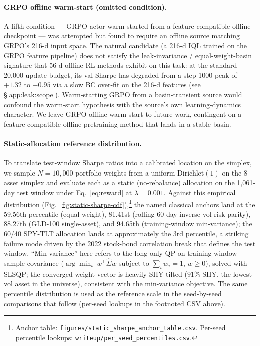 \paragraph{GRPO offline warm-start (omitted condition).}
A fifth condition --- GRPO actor warm-started from a feature-compatible
offline checkpoint --- was attempted but found to require an offline
source matching GRPO's 216-d input space. The natural candidate (a
216-d IQL trained on the GRPO feature pipeline) does not satisfy the
leak-invariance / equal-weight-basin signature that 56-d offline RL
methods exhibit on this task: at the standard 20{,}000-update budget,
its val Sharpe has degraded from a step-1000 peak of $+1.32$ to
$-0.95$ via a slow BC over-fit on the 216-d features
(see \S\ref{app:leak:scope}). Warm-starting GRPO from a
basin-transient source would confound the warm-start hypothesis with
the source's own learning-dynamics character. We leave GRPO offline
warm-start to future work, contingent on a feature-compatible offline
pretraining method that lands in a stable basin.

\paragraph{Static-allocation reference distribution.} To translate
test-window Sharpe ratios into a calibrated location on the simplex,
we sample $N{=}10{,}000$ portfolio weights from a uniform Dirichlet$(1)$
on the 8-asset simplex and evaluate each as a static (no-rebalance)
allocation on the 1{,}061-day test window under
Eq.~\ref{eq:reward} at $\lambda{=}0.001$. Against this empirical
distribution (Fig.~\ref{fig:static-sharpe-cdf}),\footnote{Anchor
table: \texttt{figures/static\_sharpe\_anchor\_table.csv}. Per-seed
percentile lookups: \texttt{writeup/per\_seed\_percentiles.csv}.}
the named
classical anchors land at the 59.56th percentile (equal-weight),
81.41st (rolling 60-day inverse-vol risk-parity), 88.27th (GLD-100
single-asset), and 94.65th (training-window min-variance); the 60/40
SPY-TLT allocation lands at approximately the 3rd percentile, a
striking failure mode driven by the 2022 stock-bond correlation break
that defines the test window. ``Min-variance'' here refers to
the long-only QP on training-window sample covariance
($\arg\min_w w^\top \widehat{\Sigma} w$ subject to $\sum_i w_i = 1$,
$w \geq 0$), solved with SLSQP; the converged weight vector is
heavily SHY-tilted ($91\%$ SHY, the lowest-vol asset in the universe),
consistent with the min-variance objective. The same percentile
distribution is used as the reference scale in the seed-by-seed
comparisons that follow (per-seed lookups in the footnoted CSV above).

